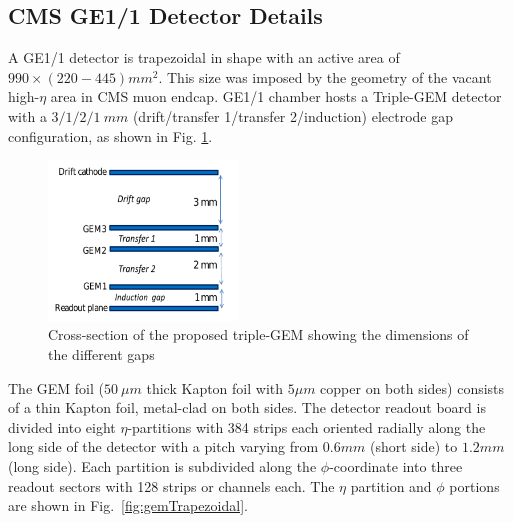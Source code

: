 \subsection{CMS GE1/1 Detector Details} %
\label{sub:GE1/1_detector_details}
A GE1/1 detector is trapezoidal in shape with an active area of $990\times (220-445)mm^2$.
This size was imposed by the geometry of the vacant high-$\eta$ area in CMS muon endcap.
GE1/1 chamber hosts a Triple-GEM detector with a $3/1/2/1~mm$ (drift/transfer 1/transfer 2/induction) electrode gap configuration, as shown in Fig. \ref{fig:tripple-gem}.
\begin{figure}[!htbp]
    \begin{center}
        \includegraphics[width=0.45\textwidth]{figures/GEM/tripple-gem.png}
        \caption{Cross-section of the proposed triple-GEM showing the dimensions of the different gaps}
        \label{fig:tripple-gem}
    \end{center}
\end{figure} 
The GEM foil ($50~\mu m$ thick Kapton foil with $5\mu m$ copper on both sides) consists of a thin Kapton foil, metal-clad on both sides.
The detector readout board is divided into eight $\eta$-partitions with 384 strips each oriented radially along the long side of the detector with a pitch varying from $0.6mm$ (short side) to $1.2mm$ (long side).
Each partition is subdivided along the $\phi$-coordinate into three readout sectors with 128 strips or channels each. The $\eta$ partition and $\phi$ portions are shown in Fig.~\ref{fig:gemTrapezoidal}.

